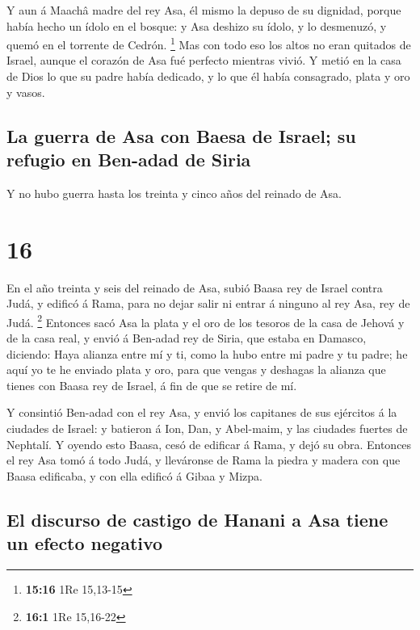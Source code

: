 Y aun á Maachâ madre del rey Asa, él mismo la depuso de su
dignidad, porque había hecho un ídolo en el bosque: y Asa deshizo su
ídolo, y lo desmenuzó, y quemó en el torrente de Cedrón. \footnote{\textbf{15:16}
  1Re 15,13-15}  Mas con todo eso los altos no eran
quitados de Israel, aunque el corazón de Asa fué perfecto mientras
vivió.  Y metió en la casa de Dios lo que su padre había
dedicado, y lo que él había consagrado, plata y oro y vasos.

\hypertarget{la-guerra-de-asa-con-baesa-de-israel-su-refugio-en-ben-adad-de-siria}{%
\subsection{La guerra de Asa con Baesa de Israel; su refugio en Ben-adad
de
Siria}\label{la-guerra-de-asa-con-baesa-de-israel-su-refugio-en-ben-adad-de-siria}}

 Y no hubo guerra hasta los treinta y cinco años del
reinado de Asa.

\hypertarget{section-15}{%
\section{16}\label{section-15}}

 En el año treinta y seis del reinado de Asa, subió Baasa
rey de Israel contra Judá, y edificó á Rama, para no dejar salir ni
entrar á ninguno al rey Asa, rey de Judá. \footnote{\textbf{16:1} 1Re
  15,16-22}  Entonces sacó Asa la plata y el oro de los
tesoros de la casa de Jehová y de la casa real, y envió á Ben-adad rey
de Siria, que estaba en Damasco, diciendo:  Haya alianza
entre mí y ti, como la hubo entre mi padre y tu padre; he aquí yo te he
enviado plata y oro, para que vengas y deshagas la alianza que tienes
con Baasa rey de Israel, á fin de que se retire de mí.

 Y consintió Ben-adad con el rey Asa, y envió los capitanes
de sus ejércitos á la ciudades de Israel: y batieron á Ion, Dan, y
Abel-maim, y las ciudades fuertes de Nephtalí.  Y oyendo
esto Baasa, cesó de edificar á Rama, y dejó su obra. 
Entonces el rey Asa tomó á todo Judá, y lleváronse de Rama la piedra y
madera con que Baasa edificaba, y con ella edificó á Gibaa y Mizpa.

\hypertarget{el-discurso-de-castigo-de-hanani-a-asa-tiene-un-efecto-negativo}{%
\subsection{El discurso de castigo de Hanani a Asa tiene un efecto
negativo}\label{el-discurso-de-castigo-de-hanani-a-asa-tiene-un-efecto-negativo}}

